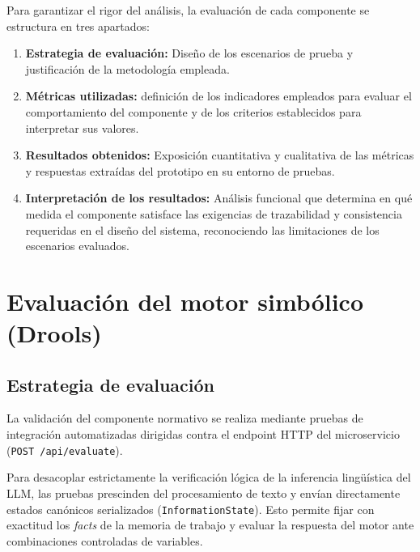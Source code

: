 \documentclass[12pt,a4paper]{report}
\begin{document}
Para garantizar el rigor del análisis, la evaluación de cada componente se estructura en tres apartados:
\begin{enumerate}
    \item \textbf{Estrategia de evaluación:} Diseño de los escenarios de prueba y justificación de la metodología empleada.
    \item \textbf{Métricas utilizadas:} definición de los indicadores empleados para evaluar el comportamiento del componente y de los criterios establecidos para interpretar sus valores.
    \item \textbf{Resultados obtenidos:} Exposición cuantitativa y cualitativa de las métricas y respuestas extraídas del prototipo en su entorno de pruebas.
    \item \textbf{Interpretación de los resultados:} Análisis funcional que determina en qué medida el componente satisface las exigencias de trazabilidad y consistencia requeridas en el diseño del sistema, reconociendo las limitaciones de los escenarios evaluados.
\end{enumerate}

\section{Evaluación del motor simbólico (Drools)}

\subsection{Estrategia de evaluación}

La validación del componente normativo se realiza mediante pruebas de integración automatizadas dirigidas contra el endpoint HTTP del microservicio (\texttt{POST /api/evaluate}). 

Para desacoplar estrictamente la verificación lógica de la inferencia lingüística del LLM, las pruebas prescinden del procesamiento de texto y envían directamente estados canónicos serializados (\texttt{InformationState}). Esto permite fijar con exactitud los \textit{facts} de la memoria de trabajo y evaluar la respuesta del motor ante combinaciones controladas de variables.
\end{document}
